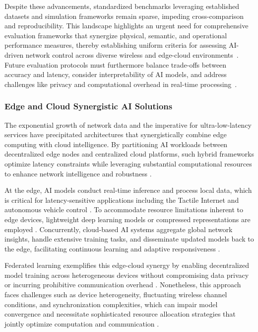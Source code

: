 \documentclass[sigconf]{acmart}
\begin{document}
Despite these advancements, standardized benchmarks leveraging established datasets and simulation frameworks remain sparse, impeding cross-comparison and reproducibility. This landscape highlights an urgent need for comprehensive evaluation frameworks that synergize physical, semantic, and operational performance measures, thereby establishing uniform criteria for assessing AI-driven network control across diverse wireless and edge-cloud environments~\cite{ref50}. Future evaluation protocols must furthermore balance trade-offs between accuracy and latency, consider interpretability of AI models, and address challenges like privacy and computational overhead in real-time processing~\cite{ref50,ref7}.

\subsubsection{Edge and Cloud Synergistic AI Solutions}

The exponential growth of network data and the imperative for ultra-low-latency services have precipitated architectures that synergistically combine edge computing with cloud intelligence. By partitioning AI workloads between decentralized edge nodes and centralized cloud platforms, such hybrid frameworks optimize latency constraints while leveraging substantial computational resources to enhance network intelligence and robustness \cite{ref8,ref9,ref13,ref16,ref49,ref50}.

At the edge, AI models conduct real-time inference and process local data, which is critical for latency-sensitive applications including the Tactile Internet and autonomous vehicle control \cite{ref10}. To accommodate resource limitations inherent to edge devices, lightweight deep learning models or compressed representations are employed \cite{ref8,ref13}. Concurrently, cloud-based AI systems aggregate global network insights, handle extensive training tasks, and disseminate updated models back to the edge, facilitating continuous learning and adaptive responsiveness \cite{ref9,ref16}.

Federated learning exemplifies this edge-cloud synergy by enabling decentralized model training across heterogeneous devices without compromising data privacy or incurring prohibitive communication overhead \cite{ref10}. Nonetheless, this approach faces challenges such as device heterogeneity, fluctuating wireless channel conditions, and synchronization complexities, which can impair model convergence and necessitate sophisticated resource allocation strategies that jointly optimize computation and communication \cite{ref9,ref10}.
\end{document}
